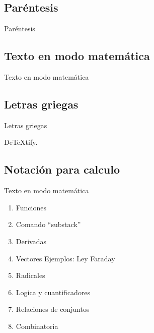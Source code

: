 \documentclass[../slides.tex]{subfiles}
\begin{document}
    \subsection{Paréntesis}

    \begin{frame}{Paréntesis}
        
    \end{frame}
    
    \subsection{Texto en modo matemática}
    
    \begin{frame}{Texto en modo matemática}
    \end{frame}        
    
    \subsection{Letras griegas}

    \begin{frame}{Letras griegas}

        \begin{block}{}
            DeTeXtify.
        \end{block}
    \end{frame} 
    
    \subsection{Notación para calculo}

    \begin{frame}{Texto en modo matemática}
    \end{frame}
        \begin{enumerate}
        \item{Funciones}
            \item{Comando ``substack''}
        \item{Derivadas}
        \item{Vectores}
            Ejemplos: Ley Faraday
    
        \item{Radicales}
        
        \item{Logica y cuantificadores}
        
        \item{Relaciones de conjuntos}
        
        \item{Combinatoria} 
        \end{enumerate}
\end{document}
